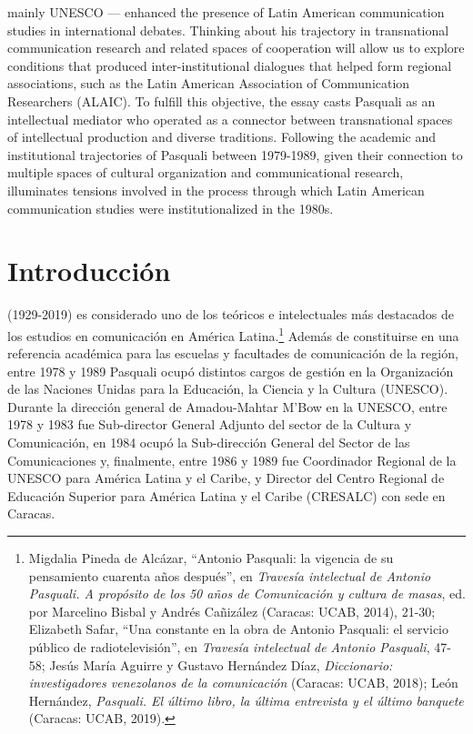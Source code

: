 \documentclass{tufte-handout}
\begin{document}
\noindent mainly UNESCO --- enhanced the presence of Latin American communication
studies in international debates. Thinking about his trajectory in
transnational communication research and related spaces of cooperation
will allow us to explore conditions that produced inter-institutional
dialogues that helped form regional associations, such as the Latin
American Association of Communication Researchers (ALAIC). To fulfill
this objective, the essay casts Pasquali as an intellectual mediator who
operated as a connector between transnational spaces of intellectual
production and diverse traditions. Following the academic and
institutional trajectories of Pasquali between 1979-1989, given their
connection to multiple spaces of cultural organization and
communicational research, illuminates tensions involved in the process
through which Latin American communication studies were
institutionalized in the 1980s.

\vspace*{2em}

\enlargethispage{\baselineskip}


\hypertarget{introduccin}{%
\section{Introducción}\label{introduccin}}

 (1929-2019) es considerado uno de los teóricos e
intelectuales más destacados de los estudios en comunicación en América
Latina.\footnote{Migdalia Pineda de Alcázar, ``Antonio Pasquali: la
  vigencia de su pensamiento cuarenta años después'', en \emph{Travesía
  intelectual de Antonio Pasquali. A propósito de los 50 años de
  Comunicación y cultura de masas}, ed. por Marcelino Bisbal y Andrés
  Cañizález (Caracas: UCAB, 2014), 21-30; Elizabeth Safar, ``Una
  constante en la obra de Antonio Pasquali: el servicio público de
  radiotelevisión'', en \emph{Travesía intelectual de Antonio Pasquali},
  47-58; Jesús María Aguirre y Gustavo Hernández Díaz,
  \emph{Diccionario: investigadores venezolanos de la comunicación}
  (Caracas: UCAB, 2018); León Hernández, \emph{Pasquali. El último
  libro, la última entrevista y el último banquete} (Caracas: UCAB,
  2019).} Además de constituirse en una referencia académica para las
escuelas y facultades de comunicación de la región, entre 1978 y 1989
Pasquali ocupó distintos cargos de gestión en la Organización de las
Naciones Unidas para la Educación, la Ciencia y la Cultura (UNESCO).
Durante la dirección general de Amadou-Mahtar M'Bow en la UNESCO, entre
1978 y 1983 fue Sub-director General Adjunto del sector de la Cultura y
Comunicación, en 1984 ocupó la Sub-dirección General del Sector de las
Comunicaciones y, finalmente, entre 1986 y 1989 fue Coordinador Regional
de la UNESCO para América Latina y el Caribe, y Director del Centro
Regional de Educación Superior para América Latina y el Caribe (CRESALC)
con sede en Caracas.
\end{document}

